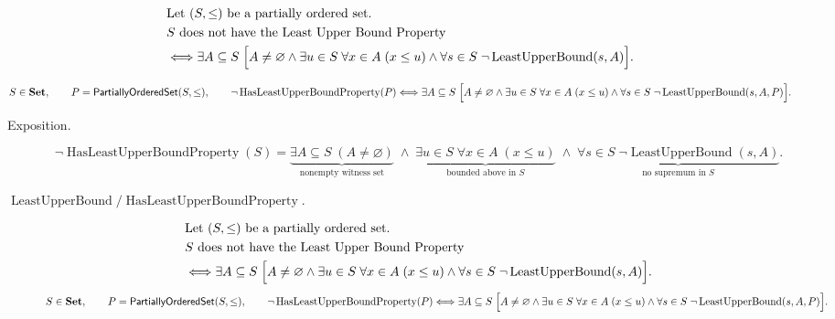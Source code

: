 \begin{remark*}
\[
\begin{aligned}
&\text{Let }(S,\le)\text{ be a partially ordered set}.\\
&S\text{ does not have the Least Upper Bound Property}\\
&\Longleftrightarrow
\exists A\subseteq S\;
\Bigl[
A\neq\varnothing
\land
\exists u\in S\;\forall x\in A\;(x\le u)
\land
\forall s\in S\;\neg\operatorname{LeastUpperBound}(s,A)
\Bigr].
\end{aligned}
\]
\end{remark*}

\begin{remark*}
\[
S\in\mathbf{Set},\qquad P=\mathsf{PartiallyOrderedSet}(S,\leq),\qquad
\neg\operatorname{HasLeastUpperBoundProperty}(P)\Longleftrightarrow
\exists A\subseteq S\;
\Bigl[
A\neq\varnothing
\land
\exists u\in S\;\forall x\in A\;(x\le u)
\land
\forall s\in S\;\neg\operatorname{LeastUpperBound}(s,A,P)
\Bigr].
\]
\end{remark*}

\begin{remark*}
\begin{description}
  \item[Exposition.]
\[
\neg\operatorname{HasLeastUpperBoundProperty}(S)
=
\underbrace{\exists A\subseteq S\;(A\neq\varnothing)}_{\text{nonempty witness set}}
\;\land\;
\underbrace{\exists u\in S\;\forall x\in A\;(x\le u)}_{\text{bounded above in }S}
\;\land\;
\underbrace{\forall s\in S\;\neg\operatorname{LeastUpperBound}(s,A)}_{\text{no supremum in }S}.
\]


  \item[\(\operatorname{LeastUpperBound} / \operatorname{HasLeastUpperBoundProperty}.\)]
  \[
\begin{aligned}
&\text{Let }(S,\le)\text{ be a partially ordered set}.\\
&S\text{ does not have the Least Upper Bound Property}\\
&\Longleftrightarrow
\exists A\subseteq S\;
\Bigl[
A\neq\varnothing
\land
\exists u\in S\;\forall x\in A\;(x\le u)
\land
\forall s\in S\;\neg\operatorname{LeastUpperBound}(s,A)
\Bigr].
\end{aligned}
\]
\[
S\in\mathbf{Set},\qquad P=\mathsf{PartiallyOrderedSet}(S,\leq),\qquad
\neg\operatorname{HasLeastUpperBoundProperty}(P)\Longleftrightarrow
\exists A\subseteq S\;
\Bigl[
A\neq\varnothing
\land
\exists u\in S\;\forall x\in A\;(x\le u)
\land
\forall s\in S\;\neg\operatorname{LeastUpperBound}(s,A,P)
\Bigr].
\]
\end{description}
\end{remark*}


